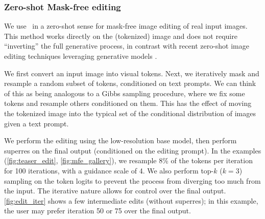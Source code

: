 \subsubsection{Zero-shot Mask-free editing}
We use \name~in a zero-shot sense for mask-free image editing of real input images. This method works directly on the (tokenized) image and does not require ``inverting'' the full generative process, in contrast with recent zero-shot image editing techniques leveraging generative models \citep{gal2022stylegan,patashnik2021styleclip,kim2022diffusionclip,nulltext2022}. 

We first convert an input image into visual tokens. Next, we iteratively mask and resample a random subset of tokens, conditioned on text prompts. We can think of this as being analogous to a Gibbs sampling procedure, where we fix some tokens and resample others conditioned on them. This has the effect of moving the tokenized image into the typical set of the conditional distribution of images given a text prompt. 

We perform the editing using the low-resolution base model, then perform superres on the final output (conditioned on the editing prompt). In the examples (\cref{fig:teaser_edit}, \cref{fig:mfe_gallery}), we resample 8\% of the tokens per iteration for 100 iterations, with a guidance scale of 4. We also perform top-$k$ ($k=3$) sampling on the token logits to prevent the process from diverging too much from the input. The iterative nature allows for control over the final output. \cref{fig:edit_iter} shows a few intermediate edits (without superres); in this example, the user may prefer iteration 50 or 75 over the final output.

